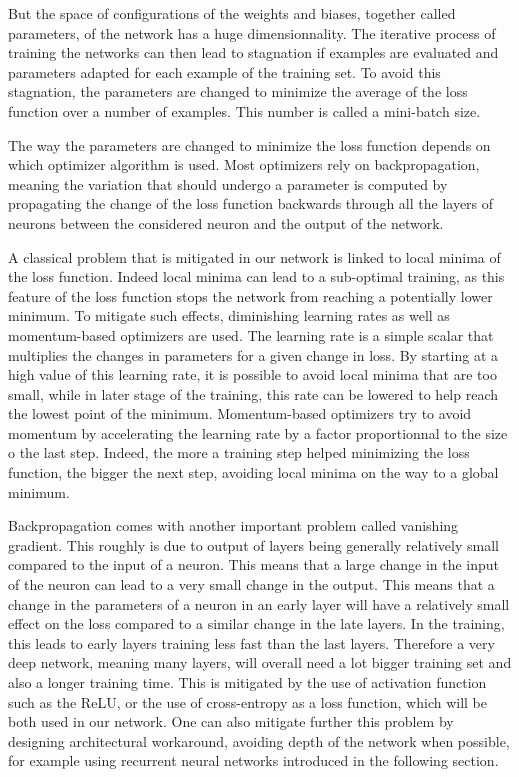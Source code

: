 But the space of configurations of the weights and biases, together called parameters, of the network has a huge dimensionnality. The iterative process of training the networks can then lead to stagnation if examples are evaluated and parameters adapted for each example of the training set. To avoid this stagnation, the parameters are changed to minimize the average of the loss function over a number of examples. This number is called a mini-batch size.

The way the parameters are changed to minimize the loss function depends on which optimizer algorithm is used. Most optimizers rely on backpropagation, meaning the variation that should undergo a parameter is computed by propagating the change of the loss function backwards through all the layers of neurons between the considered neuron and the output of the network. 


A classical problem that is mitigated in our network is linked to local minima of the loss function. Indeed local minima can lead to a sub-optimal training, as this feature of the loss function stops the network from reaching a potentially lower minimum. To mitigate such effects, diminishing learning rates as well as momentum-based optimizers are used. The learning rate is a simple scalar that multiplies the changes in parameters for a given change in loss. By starting at a high value of this learning rate, it is possible to avoid local minima that are too small, while in later stage of the training, this rate can be lowered to help reach the lowest point of the minimum. Momentum-based optimizers try to avoid momentum by accelerating the learning rate by a factor proportionnal to the size o the last step. Indeed, the more a training step helped minimizing the loss function, the bigger the next step, avoiding local minima on the way to a global minimum.

Backpropagation comes with another important problem called vanishing gradient. This roughly is due to output of layers being generally relatively small compared to the input of a neuron. This means that a large change in the input of the neuron can lead to a very small change in the output. This means that a change in the parameters of a neuron in an early layer will have a relatively small effect on the loss compared to a similar change in the late layers. In the training, this leads to early layers training less fast than the last layers. Therefore a very deep network, meaning many layers, will overall need a lot bigger training set and also a longer training time. This is mitigated by the use of activation function such as the ReLU, or the use of cross-entropy as a loss function, which will be both used in our network. One can also mitigate further this problem by designing architectural workaround, avoiding depth of the network when possible, for example using recurrent neural networks introduced in the following section.

